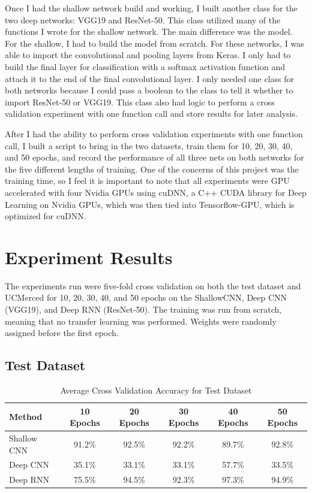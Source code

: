 \documentclass[12pt]{article}
\begin{document}
Once I had the shallow network build and working, I built another class for the two deep networks: VGG19 and ResNet-50. This class utilized many of the functions I wrote for the shallow network. The main difference was the model. For the shallow, I had to build the model from scratch. For these networks, I was able to import the convolutional and pooling layers from Keras. I only had to build the final layer for classification with a softmax activation function and attach it to the end of the final convolutional layer. I only needed one class for both networks because I could pass a boolean to the class to tell it whether to import ResNet-50 or VGG19. This class also had logic to perform a cross validation experiment with one function call and store results for later analysis. 

After I had the ability to perform cross validation experiments with one function call, I built a script to bring in the two datasets, train them for 10, 20, 30, 40, and 50 epochs, and record the performance of all three nets on both networks for the five different lengths of training. One of the concerns of this project was the training time, so I feel it is important to note that all experiments were GPU accelerated with four Nvidia GPUs using cuDNN, a C++ CUDA library for Deep Learning on Nvidia GPUs, which was then tied into Tensorflow-GPU, which is optimized for cuDNN. 
	
	\section{Experiment Results}
	
	The experiments run were five-fold cross validation on  both the test dataset and UCMerced for 10, 20, 30, 40, and 50 epochs on the ShallowCNN, Deep CNN (VGG19), and Deep RNN (ResNet-50). The training was run from scratch, meaning that no transfer learning was performed. Weights were randomly assigned before the first epoch.
	\subsection{Test Dataset}

	\begin{table}[h!]
		\begin{center}
			\caption{Average Cross Validation Accuracy for Test Dataset}
			\label{table:test}
			\begin{tabular}{l | S | S | S | S |  S}
				\textbf{Method} & \textbf{10 Epochs} & \textbf{20 Epochs} & \textbf{30 Epochs} & \textbf{40 Epochs} & \textbf{50 Epochs} \\
				\hline
				Shallow CNN & 91.2\% & 92.5\% & 92.2\% & 89.7\% & 92.8\% \\
				Deep CNN & 35.1\% & 33.1\% & 33.1\% & 57.7\% & 33.5\% \\
				Deep RNN & 75.5\% & 94.5\% & 92.3\% & 97.3\% & 94.9\% \\
				
			
			\end{tabular}					
		
		
		\end{center}
	
	\end{table}
\end{document}
